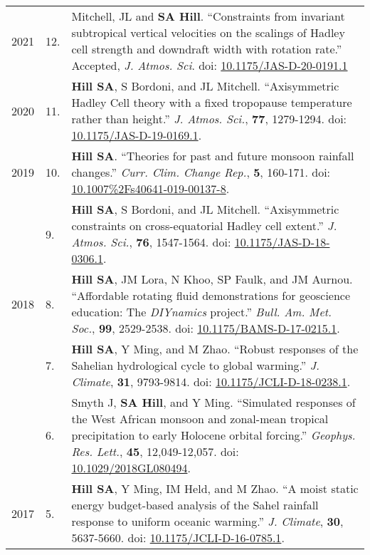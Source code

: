 \documentclass[letterpaper,11pt]{shillcv}
\begin{document}
\begin{longtable}{@{} Y{0.05\textwidth} >{\color{black}} p{0.04\textwidth} @{} L{0.91\textwidth} @{}}
2021 & 12. & Mitchell, JL and \textbf{SA Hill}.  ``Constraints from invariant
subtropical vertical velocities on the scalings of Hadley cell strength and
downdraft width with rotation rate.''  Accepted, \emph{J. Atmos. Sci}.  doi: \href{https://doi.org/10.1175/JAS-D-20-0191.1}{10.1175/JAS-D-20-0191.1}\\
2020 &  11. & \textbf{Hill SA}, S Bordoni, and JL Mitchell.
``Axisymmetric Hadley Cell theory with a fixed tropopause temperature rather
than height.'' \emph{J. Atmos. Sci.}, \textbf{77}, 1279-1294.  doi: \href{https://doi.org/10.1175/JAS-D-19-0169.1}{10.1175/JAS-D-19-0169.1}.\\
2019 & 10. & \textbf{Hill SA}.  ``Theories for past and future monsoon rainfall
changes.'' \emph{Curr. Clim. Change Rep.}, \textbf{5}, 160-171.  doi: \href{https://doi.org/10.1007\%2Fs40641-019-00137-8}{10.1007\%2Fs40641-019-00137-8}.\\
     & 9. & \textbf{Hill SA}, S Bordoni, and JL Mitchell.
``Axisymmetric constraints on cross-equatorial Hadley cell extent.''
\emph{J. Atmos. Sci.}, \textbf{76}, 1547-1564.  doi: \href{https://doi.org/10.1175/JAS-D-18-0306.1}{10.1175/JAS-D-18-0306.1}.\\
2018 & 8. & \textbf{Hill SA}, JM Lora, N Khoo, SP Faulk, and
JM Aurnou.  ``Affordable rotating fluid demonstrations for
geoscience education: The \emph{DIYnamics} project.''  \emph{Bull.
Am. Met. Soc.}, \textbf{99}, 2529-2538.  doi: \href{https://doi.org/10.1175/BAMS-D-17-0215.1}{10.1175/BAMS-D-17-0215.1}.\\
     & 7. & \textbf{Hill SA}, Y Ming, and M Zhao.  ``Robust responses of the
Sahelian hydrological cycle to global warming.''  \emph{J. Climate}, \textbf{31}, 9793-9814.  doi: \href{https://doi.org/10.1175/JCLI-D-18-0238.1}{10.1175/JCLI-D-18-0238.1}.\\
     & 6. & Smyth J, \textbf{SA Hill}, and Y Ming.  ``Simulated responses of
the West African monsoon and zonal-mean tropical precipitation to early
Holocene orbital forcing.''  \emph{Geophys. Res. Lett.}, \textbf{45},
12,049-12,057.  doi: \href{https://doi.org/10.1029/2018GL080494}{10.1029/2018GL080494}.\\
2017 & 5. & \textbf{Hill SA}, Y Ming, IM Held, and M Zhao.  ``A moist
static energy budget-based analysis of the Sahel rainfall response to uniform
oceanic warming.''  \emph{J. Climate}, \textbf{30}, 5637-5660.  doi: \href{https://doi.org/10.1175/JCLI-D-16-0785.1}{10.1175/JCLI-D-16-0785.1}.\\

\end{longtable}
\end{document}
